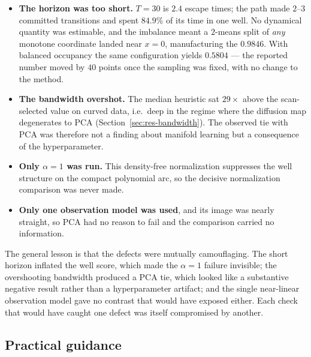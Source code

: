 \documentclass[11pt]{article}
\begin{document}
\begin{itemize}
\item \textbf{The horizon was too short.} $T=30$ is $2.4$ escape times; the path
made $2$--$3$ committed transitions and spent $84.9\%$ of its time in one well.
No dynamical quantity was estimable, and the imbalance meant a $2$-means split of
\emph{any} monotone coordinate landed near $x=0$, manufacturing the $0.9846$. With
balanced occupancy the same configuration yields $0.5804$ --- the reported number
moved by $40$ points once the sampling was fixed, with no change to the method.

\item \textbf{The bandwidth overshot.} The median heuristic sat $29\times$ above
the scan-selected value on curved data, i.e.\ deep in the regime where the
diffusion map degenerates to PCA (Section~\ref{sec:res-bandwidth}). The observed
tie with PCA was therefore not a finding about manifold learning but a
consequence of the hyperparameter.

\item \textbf{Only $\alpha=1$ was run.} This density-free normalization suppresses
the well structure on the compact polynomial arc, so the decisive normalization
comparison was never made.

\item \textbf{Only one observation model was used}, and its image was nearly
straight, so PCA had no reason to fail and the comparison carried no information.
\end{itemize}

The general lesson is that the defects were mutually camouflaging. The short
horizon inflated the well score, which made the $\alpha=1$ failure invisible; the
overshooting bandwidth produced a PCA tie, which looked like a substantive
negative result rather than a hyperparameter artifact; and the single
near-linear observation model gave no contrast that would have exposed either.
Each check that would have caught one defect was itself compromised by another.

\subsection{Practical guidance}
\end{document}
